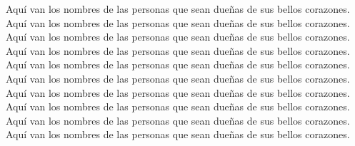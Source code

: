 \documentclass[
12pt, %
spanish, %
singlespacing, %
headsepline, %
]{Tesis_Lab25} %
\begin{document}

\begin{acknowledgements}
\addchaptertocentry{\acknowledgementname} %

Aquí van los nombres de las personas que sean dueñas de sus bellos corazones.\\

Aquí van los nombres de las personas que sean dueñas de sus bellos corazones.\\

Aquí van los nombres de las personas que sean dueñas de sus bellos corazones.\\

Aquí van los nombres de las personas que sean dueñas de sus bellos corazones.\\

Aquí van los nombres de las personas que sean dueñas de sus bellos corazones.\\

Aquí van los nombres de las personas que sean dueñas de sus bellos corazones.\\

Aquí van los nombres de las personas que sean dueñas de sus bellos corazones.\\

Aquí van los nombres de las personas que sean dueñas de sus bellos corazones.\\

Aquí van los nombres de las personas que sean dueñas de sus bellos corazones.\\

Aquí van los nombres de las personas que sean dueñas de sus bellos corazones.\\

\end{acknowledgements}


\tableofcontents %

\listoffigures %
\end{document}
